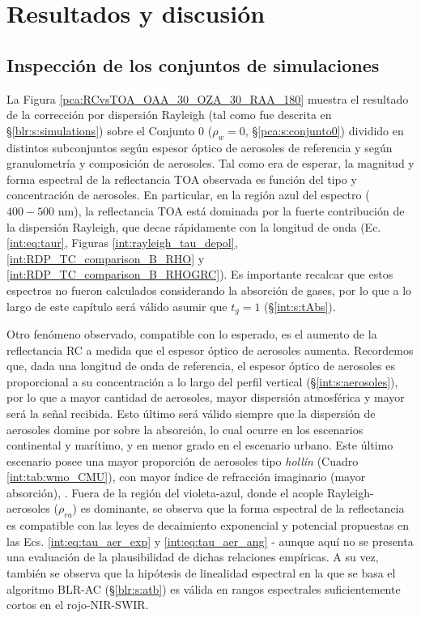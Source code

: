 \section{Resultados y discusión}
\label{pca:s:resultados}

    \subsection{Inspección de los conjuntos de simulaciones}
    \label{pca:s:results:inspeccion}

        La Figura \ref{pca:RCvsTOA_OAA_30_OZA_30_RAA_180} muestra el resultado de la corrección por dispersión Rayleigh (tal como fue descrita en \S \ref{blr:s:simulations}) sobre el Conjunto 0 ($\rho_{w}=0$, \S \ref{pca:s:conjunto0}) dividido en distintos subconjuntos según espesor óptico de aerosoles de referencia y según granulometría y composición de aerosoles. Tal como era de esperar, la magnitud y forma espectral de la reflectancia TOA observada es función del tipo y concentración de aerosoles. En particular, en la región azul del espectro ($400 - 500$ nm), la reflectancia TOA está dominada por la fuerte contribución de la dispersión Rayleigh, que decae rápidamente con la longitud de onda (Ec. \ref{int:eq:taur}, Figuras \ref{int:rayleigh_tau_depol}, \ref{int:RDP_TC_comparison_B_RHO} y \ref{int:RDP_TC_comparison_B_RHOGRC}). Es importante recalcar que estos espectros no fueron calculados considerando la absorción de gases, por lo que a lo largo de este capítulo será válido asumir que $t_{g}=1$ (\S \ref{int:s:tAbs}).
        
        Otro fenómeno observado, compatible con lo esperado, es el aumento de la reflectancia RC a medida que el espesor óptico de aerosoles aumenta. Recordemos que, dada una longitud de onda de referencia, el espesor óptico de aerosoles es proporcional a su concentración a lo largo del perfil vertical (\S \ref{int:s:aerosoles}), por lo que a mayor cantidad de aerosoles, mayor dispersión atmosférica y mayor será la señal recibida. Esto último será válido siempre que la dispersión de aerosoles domine por sobre la absorción, lo cual ocurre en los escenarios continental y marítimo, y en menor grado en el escenario urbano. Este último escenario posee una mayor proporción de aerosoles tipo \textit{hollín} (Cuadro \ref{int:tab:wmo_CMU}), con mayor índice de refracción imaginario (mayor absorción), \cite{wmo1986}. Fuera de la región del violeta-azul, donde el acople Rayleigh-aerosoles ($\rho_{ra}$) es dominante, se observa que la forma espectral de la reflectancia es compatible con las leyes de decaimiento exponencial y potencial propuestas en las Ecs. \ref{int:eq:tau_aer_exp} y \ref{int:eq:tau_aer_ang} - aunque aquí no se presenta una evaluación de la plausibilidad de dichas relaciones empíricas. A su vez, también se observa que la hipótesis de linealidad espectral en la que se basa el algoritmo BLR-AC (\S \ref{blr:s:atb}) es válida en rangos espectrales suficientemente cortos en el rojo-NIR-SWIR.
        
